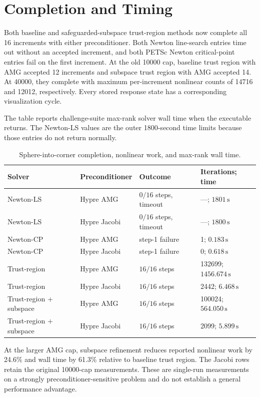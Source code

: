\documentclass[11pt]{article}
\begin{document}
\section*{Completion and Timing}

Both baseline and safeguarded-subspace trust-region methods now complete all 16
increments with either preconditioner. Both Newton line-search entries time out
without an accepted increment, and both PETSc Newton critical-point entries
fail on the first increment. At the old 10000 cap, baseline trust region with
AMG accepted 12 increments and subspace trust region with AMG accepted 14. At
40000, they complete with maximum per-increment nonlinear counts of 14716 and
12012, respectively. Every stored response state has a corresponding
visualization cycle.

The table reports challenge-suite max-rank solver wall time when the executable
returns.  The Newton-LS values are the outer 1800-second time limits because
those entries do not return normally.

\begin{table}[h]
  \centering
  \small
  \caption{Sphere-into-corner completion, nonlinear work, and max-rank wall time.}
  \begin{tabular}{@{}llll@{}}
    \toprule
    Solver & Preconditioner & Outcome & Iterations; time \\
    \midrule
    Newton-LS & Hypre AMG & $0/16$ steps, timeout & ---; $1801\,\mathrm{s}$ \\
    Newton-LS & Hypre Jacobi & $0/16$ steps, timeout & ---; $1800\,\mathrm{s}$ \\
    Newton-CP & Hypre AMG & step-1 failure & 1; $0.183\,\mathrm{s}$ \\
    Newton-CP & Hypre Jacobi & step-1 failure & 0; $0.618\,\mathrm{s}$ \\
    Trust-region & Hypre AMG & $16/16$ steps & 132699; $1456.674\,\mathrm{s}$ \\
    Trust-region & Hypre Jacobi & $16/16$ steps & 2442; $6.468\,\mathrm{s}$ \\
    Trust-region + subspace & Hypre AMG & $16/16$ steps & 100024; $564.050\,\mathrm{s}$ \\
    Trust-region + subspace & Hypre Jacobi & $16/16$ steps & 2099; $5.899\,\mathrm{s}$ \\
    \bottomrule
  \end{tabular}
\end{table}

At the larger AMG cap, subspace refinement reduces reported nonlinear work by
24.6\% and wall time by 61.3\% relative to baseline trust region. The Jacobi
rows retain the original 10000-cap measurements. These are single-run
measurements on a strongly
preconditioner-sensitive problem and do not establish a general performance
advantage.
\end{document}
